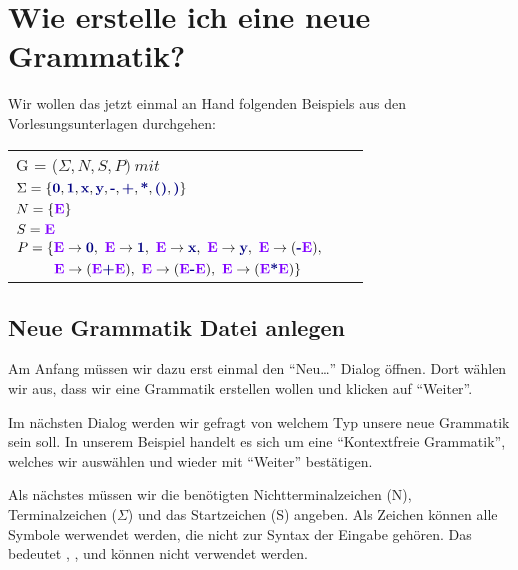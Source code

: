 \chapter{Wie erstelle ich eine neue Grammatik?}

Wir wollen das jetzt einmal an Hand folgenden Beispiels aus den
Vorlesungsunterlagen durchgehen:\vspace{10pt}


\begin{tabular}{lcr}
G = ($\Sigma, N, S, P )\ mit $\\
	$\Sigma = \{\TerminalSymbol{0}, \TerminalSymbol{1}, \TerminalSymbol{x},
	\TerminalSymbol{y}, \TerminalSymbol{-}, \TerminalSymbol{+},
	\TerminalSymbol{*}, \TerminalSymbol{()}, \TerminalSymbol{)}\}$\\ $N =
	\{\StartSymbol{E}\}$\\ $S=\StartSymbol{E}$\\ 
	$P = \{\StartSymbol{E} \to \TerminalSymbol{0},\ \StartSymbol{E} \to \TerminalSymbol{1},\ 
	\StartSymbol{E}	\to \TerminalSymbol{x},\ \StartSymbol{E} \to \TerminalSymbol{y},\ 
	\StartSymbol{E} \to (\TerminalSymbol{-}\StartSymbol{E}),$\\ 
	$\ \ \ \ \ \ \ \ \StartSymbol{E} \to (\StartSymbol{E} \TerminalSymbol{+}
	\StartSymbol{E}),\ \StartSymbol{E} \to (\StartSymbol{E} \TerminalSymbol{-} \StartSymbol{E}),\
	\StartSymbol{E} \to (\StartSymbol{E} \TerminalSymbol{*} \StartSymbol{E})\}$\\
\end{tabular}

\section{Neue Grammatik Datei anlegen}
 
Am Anfang müssen wir dazu erst einmal den "`Neu\ldots"' Dialog öffnen. Dort
wählen wir aus, dass wir eine Grammatik erstellen wollen und klicken auf
"`Weiter"'.\vspace{10pt}

Im nächsten Dialog werden wir gefragt von welchem Typ unsere neue Grammatik
sein soll. In unserem Beispiel handelt es sich um eine "`Kontextfreie
Grammatik"', welches wir auswählen und wieder mit "`Weiter"' bestätigen.\vspace{10pt}

Als nächstes müssen wir die benötigten Nichtterminalzeichen (N),
Terminalzeichen ($\Sigma$) und das Startzeichen (S) angeben.  Als Zeichen
können alle Symbole werwendet werden, die nicht zur Syntax der Eingabe gehören.
Das bedeutet \Symbol{,}, \Symbol{\{}, \Symbol{\}} und \SymbolEmpty{}
können nicht verwendet werden.\vspace{10pt}


